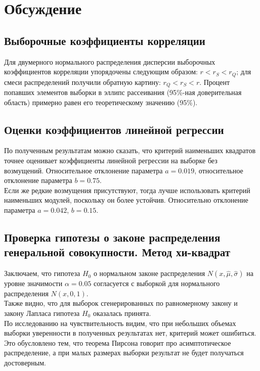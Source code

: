 \documentclass[a4paper,14pt]{article}
\begin{document}
	\section{Обсуждение}
	\subsection{Выборочные коэффициенты корреляции}
	\noindent Для двумерного нормального распределения дисперсии выборочных коэффициентов корреляции упорядочены следующим образом: $r < r_{S} < r_{Q}$; для смеси распределений получили обратную картину: $r_{Q} < r_{S} < r$.
	\newline
	\noindent Процент попавших элементов выборки в эллипс рассеивания (95$\%$-ная доверительная область) примерно равен его теоретическому значению (95$\%$).
	
	\subsection{Оценки коэффициентов линейной регрессии}
	\noindent По полученным результатам можно сказать, что критерий наименьших квадратов точнее оценивает коэффициенты линейной регрессии на выборке без возмущений. Относительное отклонение параметра $a = 0.019$, относительное отклонение параметра $b = 0.75$. \\
	Если же редкие возмущения присутствуют, тогда лучше использовать критерий наименьших модулей, поскольку он более устойчив. Относительно отклонение параметра $a = 0.042$, $b = 0.15$.
	
	\subsection{Проверка гипотезы о законе распределения генеральной совокупности. Метод хи-квадрат}
	\noindent Заключаем, что гипотеза $H_{0}$ о нормальном законе распределения $N(x,\hat{\mu}, \hat{\sigma})$ на уровне значимости $\alpha = 0.05$ согласуется с выборкой для нормального распределения $N(x, 0, 1)$.
	\\
	Также видно, что для выборок сгенерированных по равномерному закону и закону Лапласа гипотеза $H_{0}$ оказалась принята.\\
	По исследованию на чувствительность видим, что при небольших объемах
	выборки уверенности в полученных результатах нет, критерий может ошибиться. Это обусловлено тем, что теорема Пирсона говорит про асимптотическое
	распределение, а при малых размерах выборки результат не будет получаться
	достоверным.
	
\end{document}
